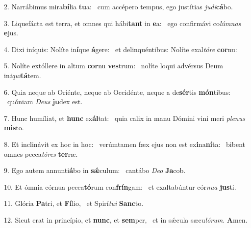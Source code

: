 2. Narrábimus mira\textbf{bí}lia \textbf{tu}a: \ast\  cum accépero tempus, ego justítias \textit{ju}\textit{di}\textbf{cá}bo.\

3. Liquefácta est terra, et omnes qui hábi\textbf{tant} in \textbf{e}a: \ast\  ego confirmávi co\textit{lúm}\textit{nas} \textbf{e}jus.\

4. Dixi iníquis: Nolíte in\textbf{í}que \textbf{á}gere: \ast\  et delinquéntibus: Nolíte exal\textit{tá}\textit{re} \textbf{cor}nu:\

5. Nolíte extóllere in altum \textbf{cor}nu \textbf{ves}trum: \ast\  nolíte loqui advérsus Deum in\textit{i}\textit{qui}\textbf{tá}tem.\

6. Quia neque ab Oriénte, neque ab Occidénte, neque a de\textbf{sér}tis \textbf{món}tibus: \ast\  quóniam \textit{De}\textit{us} \textbf{ju}dex est.\

7. Hunc humíliat, et \textbf{hunc} ex\textbf{ál}tat: \ast\  quia calix in manu Dómini vini meri \textit{ple}\textit{nus} \textbf{mis}to.\

8. Et inclinávit ex hoc in hoc: \dag\  verúmtamen fæx ejus non est ex\textbf{i}na\textbf{ní}ta: \ast\  bibent omnes pecca\textit{tó}\textit{res} \textbf{ter}ræ.\

9. Ego autem annunti\textbf{á}bo in \textbf{sǽ}culum: \ast\  cantábo \textit{De}\textit{o} \textbf{Ja}cob.\

10. Et ómnia córnua pecca\textbf{tó}rum con\textbf{frín}gam: \ast\  et exaltabúntur cór\textit{nu}\textit{a} \textbf{jus}ti.\

11. Glória \textbf{Pa}tri, et \textbf{Fí}lio, \ast\  et Spirí\textit{tu}\textit{i} \textbf{Sanc}to.\

12. Sicut erat in princípio, et \textbf{nunc}, et \textbf{sem}per, \ast\  et in sǽcula sæcu\textit{ló}\textit{rum}. \textbf{A}men.\

